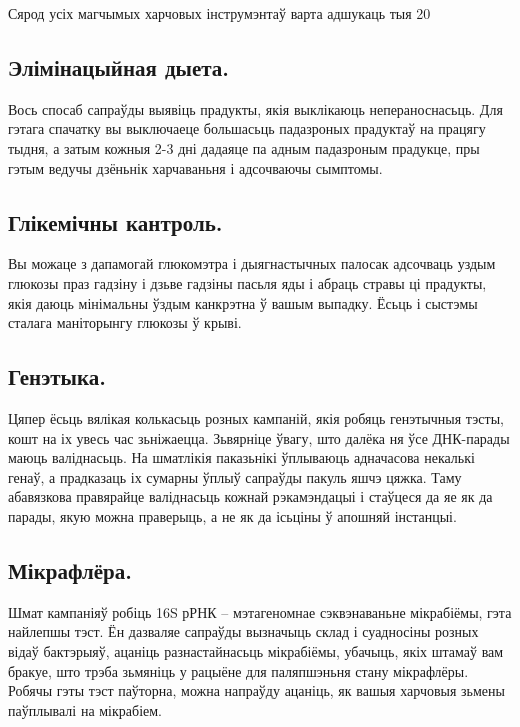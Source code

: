 Сярод усіх магчымых харчовых інструмэнтаў варта адшукаць тыя 20%

\subsection{Элімінацыйная дыета.}
Вось спосаб сапраўды выявіць прадукты, якія выклікаюць непераноснасьць. Для гэтага спачатку вы выключаеце большасьць падазроных прадуктаў на працягу тыдня, а затым кожныя 2-3 дні дадаяце па адным падазроным прадукце, пры гэтым ведучы дзёньнік харчаваньня і адсочваючы сымптомы.

\subsection{Глікемічны кантроль.}
Вы можаце з дапамогай глюкомэтра і дыягнастычных палосак адсочваць уздым глюкозы праз гадзіну і дзьве гадзіны пасьля яды і абраць стравы ці прадукты, якія даюць мінімальны ўздым канкрэтна ў вашым выпадку. Ёсьць і сыстэмы сталага маніторынгу глюкозы ў крыві.

\subsection{Генэтыка.}
Цяпер ёсьць вялікая колькасьць розных кампаній, якія робяць генэтычныя тэсты, кошт на іх увесь час зьніжаецца. Зьвярніце ўвагу, што далёка ня ўсе ДНК-парады маюць валіднасьць. На шматлікія паказьнікі ўплываюць адначасова некалькі генаў, а прадказаць іх сумарны ўплыў сапраўды пакуль яшчэ цяжка. Таму абавязкова правярайце валіднасьць кожнай рэкамэндацыі і стаўцеся да яе як да парады, якую можна праверыць, а не як да ісьціны ў апошняй інстанцыі.

\subsection{Мікрафлёра.}
Шмат кампаніяў робіць 16S рРНК – мэтагеномнае сэквэнаваньне мікрабіёмы, гэта найлепшы тэст. Ён дазваляе сапраўды вызначыць склад і суадносіны розных відаў бактэрыяў, ацаніць разнастайнасьць мікрабіёмы, убачыць, якіх штамаў вам бракуе, што трэба зьмяніць у рацыёне для паляпшэньня стану мікрафлёры. Робячы гэты тэст паўторна, можна напраўду ацаніць, як вашыя харчовыя зьмены паўплывалі на мікрабіем.

